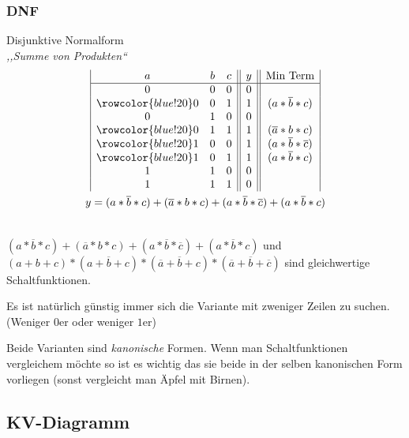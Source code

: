 \documentclass{article}
\begin{document}
\begin{minipage}{.50\linewidth}
    \subsubsection{DNF}
    Disjunktive Normalform \\
    \emph{,,Summe von Produkten``}
    \begin{gather*}
        \begin{array}{|c c c || c || c |}
            a & b & c & y   & \text{Min Term} \\
            \hline 
            0 & 0 & 0 & 0 &  \\
            \rowcolor{blue!20} 0 & 0 & 1 & 1  & (a*\overline{b}*c)  \\
            0 & 1 & 0 & 0  & \\
            \rowcolor{blue!20} 0 & 1 & 1 & 1   & (\overline{a}*b*c)  \\
            \rowcolor{blue!20} 1 & 0 & 0 & 1  & (a*\overline{b}*\overline{c})  \\ 
            \rowcolor{blue!20}  1 & 0& 1 & 1 & (a*\overline{b}*c)   \\ 
            1 & 1 & 0 & 0 & \\
            1 & 1 & 1 &  0 & \\
        \end{array} \\
        y=(a*\overline{b}*c) +  (\overline{a}*b*c) + (a*\overline{b}*\overline{c}) + (a*\overline{b}*c)
        \end{gather*}
\end{minipage} \\

$(a*\overline{b}*c) +  (\overline{a}*b*c) + (a*\overline{b}*\overline{c}) + (a*\overline{b}*c)$ und $(a+b+c)*(a+\overline{b}+c)* (\overline{a}+\overline{b}+c) *  (\overline{a}+\overline{b}+\overline{c})$
sind gleichwertige Schaltfunktionen.

\begin{info}
   Es ist natürlich günstig immer sich die Variante mit zweniger Zeilen zu suchen. (Weniger $0$er oder weniger $1$er)
\end{info}

Beide Varianten sind \emph{kanonische} Formen. Wenn man Schaltfunktionen vergleichem möchte so ist es wichtig das sie beide in der 
selben kanonischen Form vorliegen (sonst vergleicht man Äpfel mit Birnen).




\subsection{KV-Diagramm}
\end{document}
